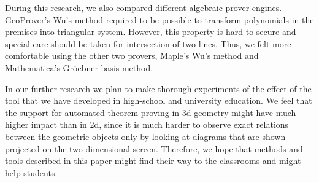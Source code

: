 \documentclass[final,1p,times,authoryear]{elsarticle}
\begin{document}
During this research, we also compared different algebraic prover
engines. GeoProver's Wu's method required to be possible to transform
polynomials in the premises into triangular system. However, this
property is hard to secure and special care should be taken for
intersection of two lines. Thus, we felt more comfortable using the
other two provers, Maple's Wu's method and Mathematica's Gr\"oebner
basis method.

In our further research we plan to make thorough experiments of the
effect of the tool that we have developed in high-school and
university education. We feel that the support for automated theorem
proving in 3d geometry might have much higher impact than in 2d, since
it is much harder to observe exact relations between the geometric
objects only by looking at diagrams that are shown projected on the
two-dimensional screen. Therefore, we hope that methods and tools
described in this paper might find their way to the classrooms and
might help students.





\end{document}
